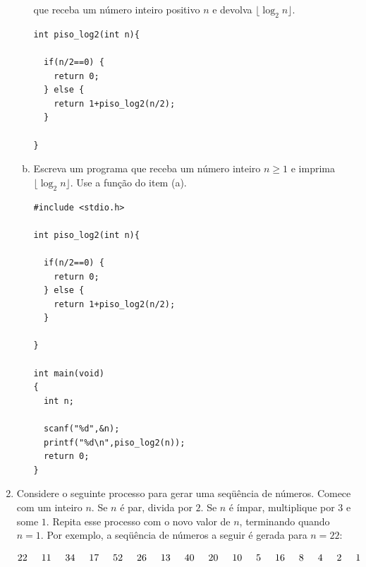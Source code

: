 \documentclass[a4paper,10pt]{article}
\begin{document}
\begin{enumerate}
\begin{enumerate}[(a)]
que receba um número inteiro positivo $n$ e devolva $\lfloor \log_2 n \rfloor$. 

\begin{lstlisting}
int piso_log2(int n){

  if(n/2==0) {
    return 0;
  } else {
    return 1+piso_log2(n/2);
  }

}
\end{lstlisting}

\item Escreva um programa que receba um número inteiro $n \geq 1$ e imprima $\lfloor \log_2 n \rfloor$. 
Use a função do item (a).

\begin{lstlisting}
#include <stdio.h>

int piso_log2(int n){

  if(n/2==0) {
    return 0;
  } else {
    return 1+piso_log2(n/2);
  }

}

int main(void)
{
  int n;

  scanf("%d",&n);
  printf("%d\n",piso_log2(n));
  return 0;
}
\end{lstlisting}



\end{enumerate}

\pagebreak

\item Considere o seguinte processo para gerar uma seqüência de números.
Comece com um inteiro $n$. Se $n$ é par, divida por $2$.
Se $n$ é ímpar, multiplique por $3$ e some $1$. 
Repita esse processo com o novo valor de $n$, terminando quando $n = 1$.
Por exemplo, a seqüência de números a seguir é gerada para $n = 22$:

  \[
  22 \hspace*{.5cm} 11 \hspace*{.5cm} 34 \hspace*{.5cm} 17 
  \hspace*{.5cm} 52 \hspace*{.5cm} 26 \hspace*{.5cm} 13 \hspace*{.5cm} 
  40 \hspace*{.5cm} 20 \hspace*{.5cm} 10 \hspace*{.5cm} 5
  \hspace*{.5cm} 16 \hspace*{.5cm} 8 \hspace*{.5cm} 4 \hspace*{.5cm} 2
  \hspace*{.5cm} 1   
  \]


\end{enumerate}
\end{document}
